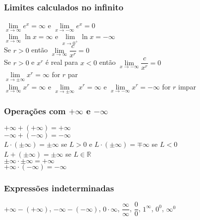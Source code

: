 \begin{tcolorbox}


\begin{multicols}{2}
\subsubsection*{Limites calculados no infinito}
    $\lim\limits_{x \to \infty} e^x = \infty$ e $\lim\limits_{x \to -\infty} e^x = 0$\\[0.1cm]
    
   $\lim\limits_{x \to \infty} \ln x = \infty$ e $\lim\limits_{x \to 0^{+}} \ln x = -\infty$\\[0.1cm]
   
    Se $r>0$ então $\lim\limits_{x \to \infty}\dfrac{c}{x^r}=0$\\[0.1cm]
    
     Se $r>0$ e $x^r$ é real para $x< 0$ então $\lim\limits_{x \to -\infty }\dfrac{c}{x^r}=0$\\[0.1cm]
    
     $\lim\limits_{x \to \pm\infty} x^r=\infty$ for $r$ par\\[0.1cm]
    
     $\lim\limits_{x \to \infty} x^r=\infty$ e $\lim\limits_{x \to \pm\infty}$
     $x^r=\infty$ e $\lim\limits_{x \to -\infty} x^r=-\infty$ for $r$ impar\\[0.1cm]
\columnbreak
\subsubsection*{Operações com $+\infty$ e $-\infty$}

     $+\infty +(+\infty)=+\infty$\\[0.1cm]
     $-\infty + (-\infty) = -\infty$\\[0.1cm]
    $L\cdot (\pm \infty)=\pm\infty$ se $L>0$ e $L\cdot (\pm\infty)=\mp\infty$ se $L<0$\\[0.1cm]
     $L+ (\pm\infty)=\pm\infty$ se $L\in \mathbb{R}$\\[0.1cm]
     $\pm\infty\cdot\pm\infty=+\infty$\\[0.1cm]
     $+\infty\cdot (-\infty)=-\infty$\\[0.1cm]
     
\subsubsection*{Expressões indeterminadas}
$+\infty -(+\infty)$, $-\infty-(-\infty)$, $0\cdot \infty$, $\dfrac{\infty}{\infty}$, $\dfrac{0}{0}$, $1^{\infty}$, $0^0$, $\infty^0$
\end{multicols}
\end{tcolorbox}

